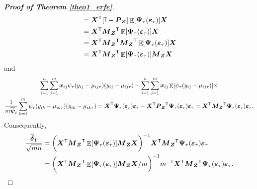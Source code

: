 \documentclass[15pt,a4paper]{article}
\DeclareMathOperator{\E}{\mathbb{E}}
\newcommand{\transpose}{{}^{\text{\sffamily T}}}
\begin{document}
\begin{proof}[\textbf{Proof of Theorem \ref{theo1_erfe}}]
\begin{equation*}
\begin{split}
   {}&=\boldsymbol{X}\transpose[\mathbb{I}-\boldsymbol{P}_{\boldsymbol{Z}}]\E[\boldsymbol{\Psi}_\tau(\boldsymbol{\varepsilon}_{\tau})]\boldsymbol{X}\\   
   {}&=\boldsymbol{X}\transpose\boldsymbol{M}_{\boldsymbol{Z}}\transpose\E[\boldsymbol{\Psi}_\tau(\boldsymbol{\varepsilon}_{\tau})]\boldsymbol{X}\\
   {}&=\boldsymbol{X}\transpose\boldsymbol{M}_{\boldsymbol{Z}}\transpose\boldsymbol{M}_{\boldsymbol{Z}}\transpose\E[\boldsymbol{\Psi}_\tau(\boldsymbol{\varepsilon}_{\tau})]\boldsymbol{X}\\
   {}&=\boldsymbol{X}\transpose\boldsymbol{M}_{\boldsymbol{Z}}\transpose\E[\boldsymbol{\Psi}_\tau(\boldsymbol{\varepsilon}_{\tau})]\boldsymbol{M}_{\boldsymbol{Z}}\boldsymbol{X}
\end{split}
\end{equation*}
and
\begin{multline*}
\sum_{i=1}^{n}\sum_{j=1}^{m}\boldsymbol{x}_{ij}\psi_\tau(y_{ij}-\mu_{ij\tau})(y_{ij}-\mu_{ij\tau})-\sum_{i=1}^{n}\sum_{j=1}^{m}\boldsymbol{x}_{ij}\E[\psi_\tau(y_{ij}-\mu_{ij\tau})] \times \\ \frac{1}{m\overline{\boldsymbol{\psi}}_i}\sum_{k=1}^{m}\psi_{\tau}(y_{ik}-\mu_{ik\tau})(y_{ik}-\mu_{ik\tau})
 =\boldsymbol{X}\transpose\boldsymbol{\Psi}_\tau(\boldsymbol{\varepsilon}_{\tau})\boldsymbol{\varepsilon}_{\tau}-\boldsymbol{X}\transpose\boldsymbol{P}_{\boldsymbol{Z}}\transpose\boldsymbol{\Psi}_\tau(\boldsymbol{\varepsilon}_{\tau})\boldsymbol{\varepsilon}_{\tau}
 =\boldsymbol{X}\transpose\boldsymbol{M}_{\boldsymbol{Z}}\transpose\boldsymbol{\Psi}_\tau(\boldsymbol{\varepsilon}_{\tau})
 \boldsymbol{\varepsilon}_{\tau}.
\end{multline*}
Consequently,
\begin{equation}\label{delta1_erfe}
\begin{split}
\frac{\widehat{\boldsymbol{\delta}}_{1}}{\sqrt{mn}} &= \bigg(\boldsymbol{X}\transpose\boldsymbol{M}_{\boldsymbol{Z}}\transpose \E[\boldsymbol{\Psi}_\tau(\boldsymbol{\varepsilon}_{\tau})]\boldsymbol{M}_{\boldsymbol{Z}}\boldsymbol{X}\bigg)^{-1}
   \boldsymbol{X}\transpose\boldsymbol{M}_{\boldsymbol{Z}}\transpose\boldsymbol{\Psi}_\tau(\boldsymbol{\varepsilon}_{\tau})\boldsymbol{\varepsilon}_{\tau} \\
   &= \bigg(\boldsymbol{X}\transpose\boldsymbol{M}_{\boldsymbol{Z}}\transpose \E[\boldsymbol{\Psi}_\tau(\boldsymbol{\varepsilon}_{\tau})]\boldsymbol{M}_{\boldsymbol{Z}}\boldsymbol{X}/m\bigg)^{-1}
   m^{-1}\boldsymbol{X}\transpose\boldsymbol{M}_{\boldsymbol{Z}}\transpose\boldsymbol{\Psi}_\tau(\boldsymbol{\varepsilon}_{\tau})\boldsymbol{\varepsilon}_{\tau}. \\

\end{split}
\end{equation}
\end{proof}
\end{document}
